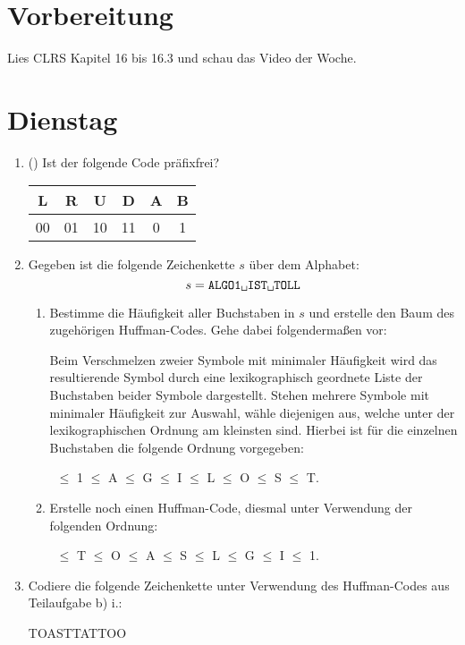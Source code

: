 \documentclass{uebung_cs}
\begin{document}
\section*{Vorbereitung}
Lies CLRS Kapitel 16 bis 16.3 und schau das Video der Woche.

\section*{Dienstag}
\begin{aufgabe}\phantom{.}
    \begin{enumerate}
        \item (\warmup) Ist der folgende Code präfixfrei?
        \begin{center}
            { \ttfamily
            \begin{tabular}{c|c|c|c|c|c}
                L & R & U & D & A & B \\ \hline
                00 & 01 & 10 & 11 & 0 & 1 
            \end{tabular}
            }
        \end{center}
        \item Gegeben ist die folgende Zeichenkette $s$ über dem Alphabet:
        $$
            s = \texttt{ALGO1\textvisiblespace IST\textvisiblespace TOLL}
        $$
        \begin{enumerate}
            \item[i.] Bestimme die Häufigkeit aller Buchstaben in $s$ und erstelle den Baum des zugehörigen Huffman-Codes. Gehe dabei folgendermaßen vor:
            
            Beim Verschmelzen zweier Symbole mit minimaler Häufigkeit wird das resultierende Symbol durch eine lexikographisch geordnete Liste der Buchstaben beider Symbole dargestellt. Stehen mehrere Symbole mit minimaler Häufigkeit zur Auswahl, wähle diejenigen aus, welche unter der lexikographischen Ordnung am kleinsten sind. Hierbei ist für die einzelnen Buchstaben die folgende Ordnung vorgegeben:
            \begin{center}
                {\ttfamily \textvisiblespace\ $\leq$ 1 $\leq$ A $\leq$ G $\leq$ I $\leq$ L $\leq$ O $\leq$ S $\leq$ T}.
            \end{center}
            \item[ii.] Erstelle noch einen Huffman-Code, diesmal unter Verwendung der folgenden Ordnung:
            \begin{center}
                {\ttfamily \textvisiblespace\ $\leq$ T $\leq$ O $\leq$ A $\leq$ S $\leq$ L $\leq$ G $\leq$ I $\leq$ 1}.
            \end{center}
        \end{enumerate}
        \item Codiere die folgende Zeichenkette unter Verwendung des Huffman-Codes aus Teilaufgabe b) i.:
        \begin{center}
            \textvisiblespace TOAST\textvisiblespace TATTOO
        \end{center}
    \end{enumerate}
\end{aufgabe}
\end{document}
